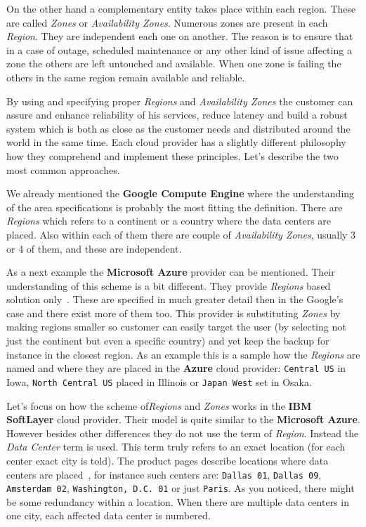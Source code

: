 On the other hand a complementary entity takes place within each region. These are called \emph{Zones} or \emph{Availability Zones}. Numerous zones are present in each \emph{Region}. They are independent each one on another. The reason is to ensure that in a case of outage, scheduled maintenance or any other kind of issue affecting a zone the others are left untouched and available. When one zone is failing the others in the same region remain available and reliable.

By using and specifying proper \emph{Regions} and \emph{Availability Zones} the customer can assure and enhance reliability of his services, reduce latency and build a robust system which is both as close as the customer needs and distributed around the world in the same time. Each cloud provider has a slightly different philosophy how they comprehend and implement these principles. Let's describe the two most common approaches.

We already mentioned the \textbf{Google Compute Engine} where the understanding of the area specifications is probably the most fitting the definition. There are \emph{Regions} which refers to a continent or a country where the data centers are placed. Also within each of them there are couple of \emph{Availability Zones}, usually 3 or 4 of them, and these are independent.

As a next example the \textbf{Microsoft Azure} provider can be mentioned. Their understanding of this scheme is a bit different. They provide \emph{Regions} based solution only~\cite{azure}. These are specified in much greater detail then in the Google's case and there exist more of them too. This provider is substituting \emph{Zones} by making regions smaller so customer can easily target the user (by selecting not just the continent but even a specific country) and yet keep the backup for instance in the closest region. As an example this is a sample how the \emph{Regions} are named and where they are placed in the \textbf{Azure} cloud provider: \texttt{Central US} in Iowa, \texttt{North Central US} placed in Illinois or \texttt{Japan West} set in Osaka.

Let's focus on how the scheme of\emph{Regions} and \emph{Zones} works in the \textbf{IBM SoftLayer} cloud provider. Their model is quite similar to the \textbf{Microsoft Azure}. However besides other differences they do not use the term of \emph{Region}. Instead the \emph{Data Center} term is used. This term truly refers to an exact location (for each center exact city is told). The product pages describe locations where data centers are placed~\cite{softlayer_datacenters}, for instance such centers are: \texttt{Dallas 01}, \texttt{Dallas 09}, \texttt{Amsterdam 02}, \texttt{Washington, D.C. 01} or just \texttt{Paris}. As you noticed, there might be some redundancy within a location. When there are multiple data centers in one city, each affected data center is numbered.

